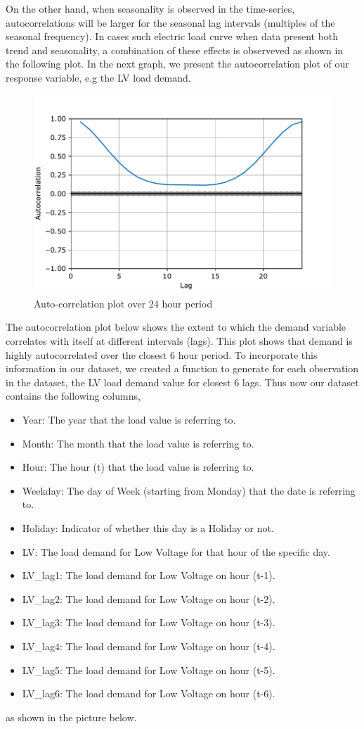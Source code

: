 On the other hand, when seasonality is observed in the time-series, autocorrelations will be larger for the seasonal lag intervals (multiples of the seasonal frequency). In cases such electric load curve when data present both trend and seasonality, a combination of these effects is observeved as shown in the following plot. In the next graph, we present the autocorrelation plot of our response variable, e.g the LV load demand. 
\begin{figure}[ht!]
\centering
\includegraphics[width=0.6\linewidth]{project/ac.pdf}

\caption{Auto-correlation plot over 24 hour period}
\end{figure}
\par The autocorrelation plot below shows the extent to which the demand variable correlates with itself at different intervals (lags). This plot shows that demand is highly autocorrelated over the closest 6 hour period. To incorporate this information in our dataset, we created a function to generate for each observation in the dataset, the LV load demand value for closest 6 lags. Thus now our dataset contains the following columns, 
\begin{itemize}
    \item Year: The year that the load value is referring to.
    \item Month: The month that the load value is referring to.
    \item Hour: The hour (t) that the load value is referring to.
    \item Weekday: The day of Week (starting from Monday) that the date is referring to.
    \item Holiday: Indicator of whether this day is a Holiday or not.
    \item LV: The load demand for Low Voltage for that hour of the specific day.
    \item LV\_lag1: The load demand for Low Voltage on hour (t-1). 
    \item LV\_lag2: The load demand for Low Voltage on hour (t-2). 
    \item LV\_lag3: The load demand for Low Voltage on hour (t-3). 
    \item LV\_lag4: The load demand for Low Voltage on hour (t-4). 
    \item LV\_lag5: The load demand for Low Voltage on hour (t-5). 
    \item LV\_lag6: The load demand for Low Voltage on hour (t-6). 
\end{itemize}
as shown in the picture below.

